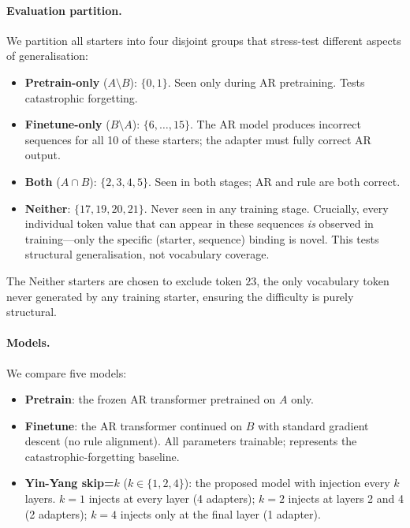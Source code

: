 \documentclass[10pt,twocolumn]{article}
\begin{document}
\paragraph{Evaluation partition.}
We partition all starters into four disjoint groups that stress-test different aspects of generalisation:

\begin{itemize}[leftmargin=*,itemsep=2pt]
  \item \textbf{Pretrain-only} ($A \setminus B$): $\{0, 1\}$. Seen only during AR pretraining. Tests catastrophic forgetting.
  \item \textbf{Finetune-only} ($B \setminus A$): $\{6,\ldots,15\}$. The AR model produces incorrect sequences for all 10 of these starters; the adapter must fully correct AR output.
  \item \textbf{Both} ($A \cap B$): $\{2,3,4,5\}$. Seen in both stages; AR and rule are both correct.
  \item \textbf{Neither}: $\{17, 19, 20, 21\}$. Never seen in any training stage. Crucially, every individual token value that can appear in these sequences \emph{is} observed in training---only the specific (starter, sequence) binding is novel. This tests structural generalisation, not vocabulary coverage.
\end{itemize}

The Neither starters are chosen to exclude token $23$, the only vocabulary token never generated by any training starter, ensuring the difficulty is purely structural.

\paragraph{Models.}
We compare five models:
\begin{itemize}[leftmargin=*,itemsep=2pt]
  \item \textbf{Pretrain}: the frozen AR transformer pretrained on $A$ only.
  \item \textbf{Finetune}: the AR transformer continued on $B$ with standard gradient descent (no rule alignment). All parameters trainable; represents the catastrophic-forgetting baseline.
  \item \textbf{Yin-Yang skip=$k$} ($k \in \{1, 2, 4\}$): the proposed model with injection every $k$ layers. $k=1$ injects at every layer (4 adapters); $k=2$ injects at layers 2 and 4 (2 adapters); $k=4$ injects only at the final layer (1 adapter).
\end{itemize}
\end{document}
